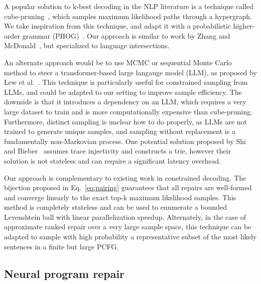 \documentclass[sigplan,review,acmsmall,nonacm,anonymous]{acmart}\settopmatter{printfolios=false,printccs=false,printacmref=false}
\begin{document}
A popular solution to k-best decoding in the NLP literature is a technique called cube-pruning~\cite{huang2005better, huang2007forest, chiang2007hierarchical}, which samples maximum likelihood paths through a hypergraph. We take inspiration from this technique, and adapt it with a probabilistic higher-order grammar (PHOG)~\cite{bielik2016phog}. Our approach is similar to work by Zhang and McDonald~\cite{zhang2012generalized}, but specialized to language intersections.

  An alternate approach would be to use MCMC or sequential Monte Carlo method to steer a transformer-based large langauge model (LLM), as proposed by Lew et al.~\cite{lew2023sequential}. This technique is particularly useful for constrained sampling from LLMs, and could be adapted to our setting to improve sample efficiency. The downside is that it introduces a dependency on an LLM, which requires a very large dataset to train and is more computationally expensive than cube-pruning. Furthermore, distinct sampling is unclear how to do properly, as LLMs are not trained to generate unique samples, and sampling without replacement is a fundamentally non-Markovian process. One potential solution proposed by Shi and Bieber~\cite{shi2020incremental} assumes trace injectivity and constructs a trie, however their solution is not stateless and can require a significant latency overhead.

  Our approach is complementary to existing work in constrained decoding. The bijection proposed in Eq.~\ref{eq:pairing} guarantees that all repairs are well-formed and converge linearly to the exact top-k maximum likelihood samples. This method is completely stateless and can be used to enumerate a bounded Levenshtein ball with linear parallelization speedup. Alternately, in the case of approximate ranked repair over a very large sample space, this technique can be adapted to sample with high probability a representative subset of the most likely sentences in a finite but large PCFG.

  \subsection{Neural program repair}
\end{document}

